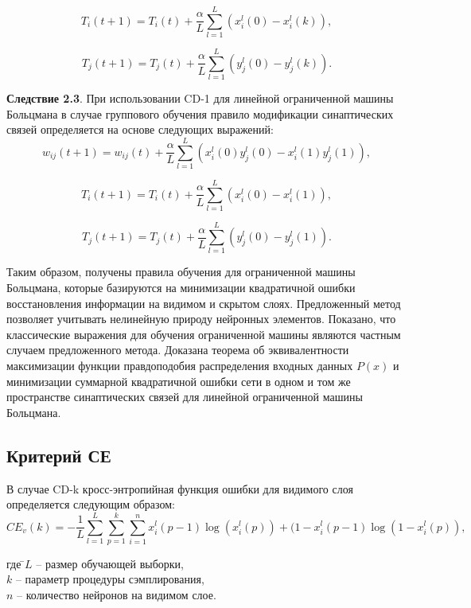 \begin{equation*}
    T_{i}(t+1)=T_{i}(t)+\frac{\alpha}{L}\sum_{l=1}^L (x_i^l(0)-x_i^l(k)),
\end{equation*}

\begin{equation*}
    T_{j}(t+1)=T_{j}(t)+\frac{\alpha}{L}\sum_{l=1}^L (y_j^l(0)-y_j^l(k)).
\end{equation*}

\textbf{Следствие 2.3}. При использовании  CD-1 для линейной ограниченной машины Больцмана в случае группового обучения правило модификации синаптических связей определяется на основе следующих выражений:
\begin{equation*}
    w_{ij}(t+1)=w_{ij}(t)+\frac{\alpha}{L}\sum_{l=1}^L (x_i^l(0)y_j^l(0)-x_i^l(1)y_j^l(1)),
\end{equation*}

\begin{equation*}
    T_{i}(t+1)=T_{i}(t)+\frac{\alpha}{L}\sum_{l=1}^L (x_i^l(0)-x_i^l(1)),
\end{equation*}

\begin{equation*}
    T_{j}(t+1)=T_{j}(t)+\frac{\alpha}{L}\sum_{l=1}^L (y_j^l(0)-y_j^l(1)).
\end{equation*}

Таким образом, получены правила обучения для ограниченной машины Больцмана, которые базируются на минимизации квадратичной ошибки восстановления информации на видимом и скрытом слоях.  Предложенный метод позволяет учитывать нелинейную природу нейронных элементов. Показано, что классические выражения для обучения ограниченной машины являются частным случаем предложенного метода. Доказана теорема об эквивалентности максимизации функции правдоподобия распределения входных данных $P(x)$ и минимизации суммарной квадратичной ошибки сети в одном и том же пространстве синаптических связей для линейной ограниченной машины Больцмана. 

\subsection{Критерий СЕ}

В случае CD-k кросс-энтропийная функция ошибки для видимого слоя определяется следующим образом:
\begin{equation*}
	CE_v(k) = -\frac{1}{L}\sum_{l=1}^L \sum_{p=1}^k \sum_{i=1}^n x_i^l(p-1)\log(x_i^l(p))+(1-x_i^l(p-1)\log(1-x_i^l(p)),
\end{equation*}
\begin{tabbing}	
где \=$L$ -- размер обучающей выборки,\\
\>$k$ -- параметр процедуры сэмплирования,\\
\>$n$ -- количество нейронов на видимом слое.
\end{tabbing}

